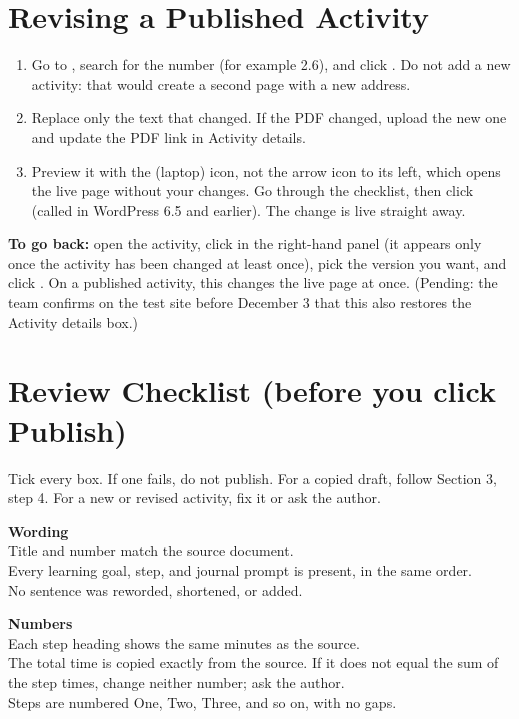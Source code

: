 \section{Revising a Published Activity}
\begin{enumerate}
  \item Go to , search for the number (for example 2.6), and click . Do not add a new activity: that would create a second page with a new address.
  \item Replace only the text that changed. If the PDF changed, upload the new one and update the PDF link in Activity details.
  \item Preview it with the  (laptop) icon, not the arrow icon to its left, which opens the live page without your changes. Go through the checklist, then click  (called  in WordPress 6.5 and earlier). The change is live straight away.
\end{enumerate}
\textbf{To go back:} open the activity, click  in the right-hand panel (it appears only once the activity has been changed at least once), pick the version you want, and click . On a published activity, this changes the live page at once. (Pending: the team confirms on the test site before December 3 that this also restores the Activity details box.)

\section{Review Checklist (before you click Publish)}
Tick every box. If one fails, do not publish. For a copied draft, follow Section 3, step 4. For a new or revised activity, fix it or ask the author.

\textbf{Wording}\\
\chk Title and number match the source document.\\
\chk Every learning goal, step, and journal prompt is present, in the same order.\\
\chk No sentence was reworded, shortened, or added.

\textbf{Numbers}\\
\chk Each step heading shows the same minutes as the source.\\
\chk The total time is copied exactly from the source. If it does not equal the sum of the step times, change neither number; ask the author.\\
\chk Steps are numbered One, Two, Three, and so on, with no gaps.

